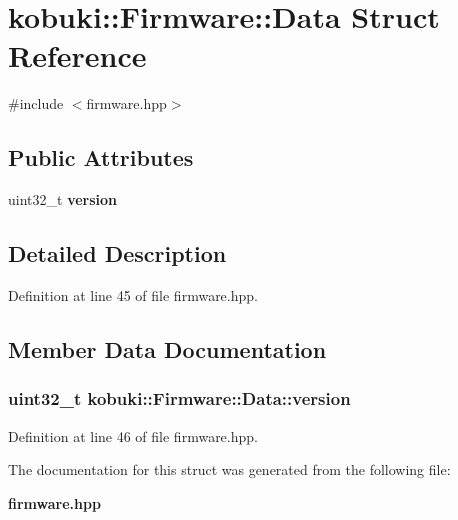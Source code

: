 \section{kobuki\-:\-:\-Firmware\-:\-:\-Data \-Struct \-Reference}
\label{structkobuki_1_1Firmware_1_1Data}


{\ttfamily \#include $<$firmware.\-hpp$>$}

\subsection*{\-Public \-Attributes}
\begin{DoxyCompactItemize}
\item 
uint32\-\_\-t {\bf version}
\end{DoxyCompactItemize}


\subsection{\-Detailed \-Description}


\-Definition at line 45 of file firmware.\-hpp.



\subsection{\-Member \-Data \-Documentation}
\subsubsection[{version}]{\setlength{\rightskip}{0pt plus 5cm}uint32\-\_\-t {\bf kobuki\-::\-Firmware\-::\-Data\-::version}}\label{structkobuki_1_1Firmware_1_1Data_aa1755f72354675dcd3dcda77eb6d055c}


\-Definition at line 46 of file firmware.\-hpp.



\-The documentation for this struct was generated from the following file\-:\begin{DoxyCompactItemize}
\item 
{\bf firmware.\-hpp}\end{DoxyCompactItemize}
